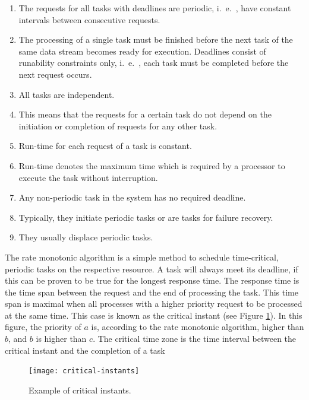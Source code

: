 \begin{multicols}{2}
	\begin{enumerate}
		\item The requests for all tasks with deadlines are periodic, i.\ e.\ , have constant intervals between consecutive requests.
		\item The processing of a single task must be finished before the next task of the same	data stream becomes ready for execution. 
		Deadlines consist of runability constraints only, i.\ e.\ , each task must be completed before the next request occurs.
		\item All tasks are independent. 
		\item This means that the requests for a certain task do not depend on the initiation or completion of requests for any other task.
		\item Run-time for each request of a task is constant. 
		\item Run-time denotes the maximum time which is required by a processor to execute the task without interruption.
		
		\item Any non-periodic task in the system has no required deadline. 
		\item Typically, they initiate periodic tasks or are tasks for failure recovery. 
		\item They usually displace	periodic tasks.
	\end{enumerate}
\end{multicols}

The rate monotonic algorithm is a simple method to schedule time-critical, periodic tasks on the respective resource. A task will always meet its deadline, if this can be proven to be true for the longest response time. The response time is the time span between the request and the end of processing the task. This time span is maximal when all processes with a higher priority request to be processed at the same time. This case is known as the critical instant (see Figure \ref{fig:critical-instants}). In this figure, the priority of $ a $ is, according to the rate monotonic algorithm, higher than $ b $, and $ b $ is higher than $ c $. The critical time zone is the time interval between the critical instant and the completion of a task

\begin{figure}[pht]
	\centering
	\texttt{[image: critical-instants]}
	\caption{Example of critical instants.}\label{fig:critical-instants}
\end{figure}


